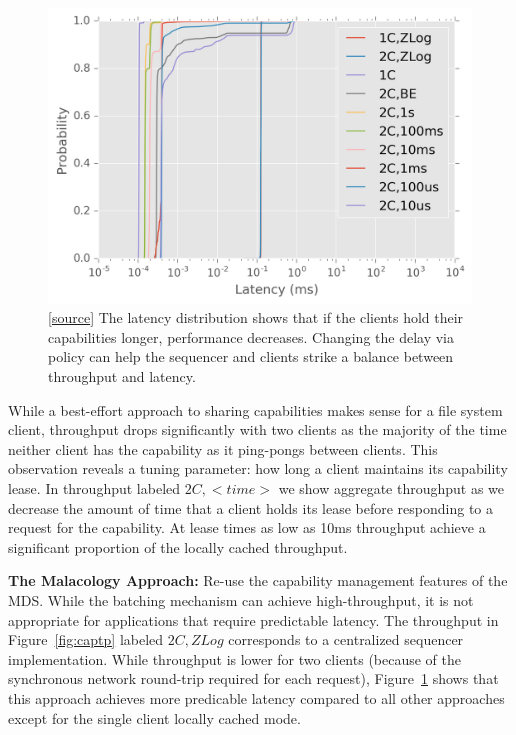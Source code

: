 \documentclass[preprint]{sigplanconf-eurosys}
\begin{document}
\begin{figure}[h]
\centering
\includegraphics{figures/caps-delay-latency.png}
\caption{[\href{https://github.com/double-blind-submitter/osdi16}{source}] The
latency distribution shows that if the clients hold their capabilities longer,
performance decreases. Changing the delay via policy can help the sequencer and
clients strike a balance between throughput and latency.}
\label{fig:capcdf}
\end{figure}

While a best-effort approach to sharing capabilities makes sense for a file
system client, throughput drops significantly with two clients as the majority
of the time neither client has the capability as it ping-pongs between
clients. This observation reveals a tuning parameter: how long a client
maintains its capability lease. In throughput labeled $2C,<time>$ we show
aggregate throughput as we decrease the amount of time that a client holds its
lease before responding to a request for the capability.  At lease times as
low as 10ms throughput achieve a significant proportion of the locally cached
throughput.

\textbf{The Malacology Approach:} Re-use the capability management features of the MDS.
While the batching mechanism can achieve high-throughput, it is not appropriate
for applications that require predictable latency. The throughput in
Figure~\ref{fig:captp} labeled $2C,ZLog$ corresponds to a centralized
sequencer implementation. While throughput is lower for two clients (because of
the synchronous network round-trip required for each request),
Figure~\ref{fig:capcdf} shows that this approach achieves more predicable
latency compared to all other approaches except for the single client locally
cached mode.
\end{document}
